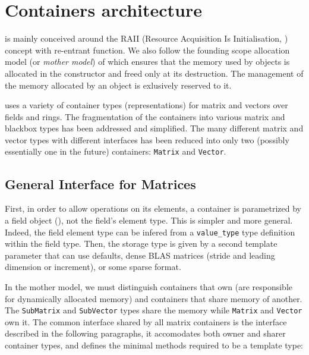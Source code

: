 \section{Containers architecture}\label{sec:container}
%
\linbox is mainly conceived around the RAII (Resource Acquisition Is
Initialisation, \cite{stroustrup1994design}) concept with re-entrant
function. We also follow the {founding scope allocation} model (or \emph{mother
model}) of \cite{Dumas:2010:lbpar} which ensures that the memory used by
objects is allocated in the constructor and freed only at its destruction. The
management of the memory allocated by an object is exlusively reserved to it.
%
\par
%
\linbox uses a variety of container types (representations) for matrix and vectors over fields and rings.
The fragmentation of the containers into various matrix and
blackbox types has been addressed and simplified. The many different matrix and
vector types with different interfaces has been reduced into only two
(possibly essentially one in the future) containers: \texttt{Matrix} and
\texttt{Vector}.
%
\subsection{General Interface for %
Matrices}
%
First, in order to allow operations on its elements, a container is
parametrized by a field object (), not the field's element
type. This is simpler and more general.
Indeed, the field element type can be infered from a
\verb!value_type! type definition within the field type.
Then, the storage type is given by a second
template parameter that can use defaults,
\eg dense BLAS matrices (stride
and leading dimension or increment), or some sparse format.
%

%
In the mother model, we must distinguish containers that own (are responsible
for dynamically allocated memory) and containers that share memory of another.  The
\texttt{SubMatrix} and \texttt{SubVector} types share the memory while
\texttt{Matrix} and \texttt{Vector} own it.
%
The common interface shared by all matrix containers is the \applin  interface
described in the following paragraphs, it accomodates both owner and sharer
container types, and defines the minimal methods required to be a
template \applin type:
%
% 
%
%

